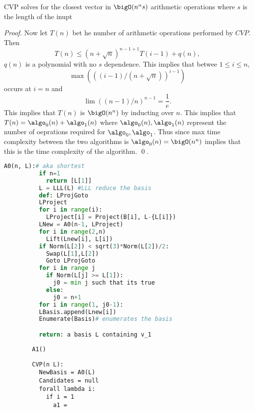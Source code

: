 \documentclass[12pt]{amsart}
\begin{document}
\begin{problem}
\begin{subproblem}
    \begin{theorem}
      CVP solves for the closest vector in $\bigO(n^ns)$ arithmetic operations where $s$ is the length of the inupt
    \end{theorem}
    \begin{proof}
      Now let $T(n)$ bet he number of arithmetic operations performed by $CVP$. Then 
      \[T(n)\leq (n+\sqrt n)^{n-1+1}T(i-1)+q(n),\]
      $q(n)$ is a polynomial with no $s$ dependence. This implies that betwee $1\leq i\leq n$, 
      \[\max(((i-1)/(n+\sqrt n))^{i-1})\]
      occurs at $i=n$ and 
      \[\lim ((n-1)/n)^{n-1}=\frac1e.\]
      This implies that $T(n)$ is $\bigO(n^n)$ by inducting over $n$. This implies that 
      $T(n) = \algo_0(n)+\algo_1(n)$ where $\algo_0(n), \algo_1(n)$ represent the number of oeprations required for $\algo_0,\algo_1$. Thus since max time complexity between the two algorithms is $\algo_0(n)=\bigO(n^n)$ implies that this is the time complexity of the algorithm. \qed.
    \end{proof}
      \begin{lstlisting}[language=Python]
        A0(n, L):# aka shortest 
          if n=1 
            return [L[1]]
          L = LLL(L) #LLL reduce the basis
          def: LProjGoto
          LProject
          for i in range(i):
            LProject[i] = Project(B[i], L-{L[i]})
          LNew = A0(n-1, LProject)
          for i in range(2,n)
            Lift(Lnew[i], L[i])
          if Norm(L[2]) < sqrt(3)*Norm(L[2])/2: 
            Swap(L[1],L[2])
            Goto LProjGoto 
          for i in range j
            if Norm(L[j] >= L[1]):
              j0 = min j such that its true 
            else: 
              j0 = n+1 
          for i in range(1, j0-1):
          LBasis.append(Lnew[i])
          Enumerate(Basis)# enumerates the basis 

          return: a basis L containing v_1 
      \end{lstlisting}
      \begin{lstlisting}
        A1() 
      \end{lstlisting}
      \begin{lstlisting}
        CVP(n L):
          NewBasis = A0(L)
          Candidates = null
          forall lambda i: 
            if i = 1 
              a1 = 

      \end{lstlisting}
    \end{subproblem}
  \end{problem} 
\end{document}
